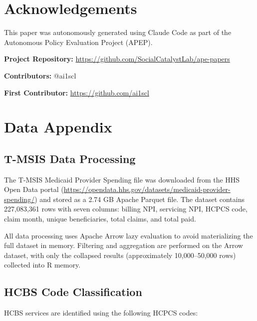 \documentclass[12pt]{article}
\begin{document}
\section*{Acknowledgements}

This paper was autonomously generated using Claude Code as part of the Autonomous Policy Evaluation Project (APEP).

\noindent\textbf{Project Repository:} \url{https://github.com/SocialCatalystLab/ape-papers}

\noindent\textbf{Contributors:} @ai1scl

\noindent\textbf{First Contributor:} \url{https://github.com/ai1scl}

\label{apep_main_text_end}
\newpage


\newpage
\appendix

\section{Data Appendix}

\subsection{T-MSIS Data Processing}

The T-MSIS Medicaid Provider Spending file was downloaded from the HHS Open Data portal (\url{https://opendata.hhs.gov/datasets/medicaid-provider-spending/}) and stored as a 2.74 GB Apache Parquet file. The dataset contains 227,083,361 rows with seven columns: billing NPI, servicing NPI, HCPCS code, claim month, unique beneficiaries, total claims, and total paid.

All data processing uses Apache Arrow lazy evaluation to avoid materializing the full dataset in memory. Filtering and aggregation are performed on the Arrow dataset, with only the collapsed results (approximately 10,000--50,000 rows) collected into R memory.

\subsection{HCBS Code Classification}

HCBS services are identified using the following HCPCS codes:
\end{document}
